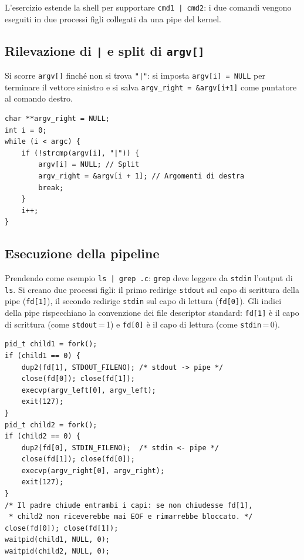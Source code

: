 \documentclass[a4paper,12pt]{article}
\begin{document}
L'esercizio estende la shell per supportare \texttt{cmd1 | cmd2}: i due
comandi vengono eseguiti in due processi figli collegati da una pipe del kernel.

\subsection*{Rilevazione di \texttt{|} e split di \texttt{argv[]}}

Si scorre \texttt{argv[]} finché non si trova \texttt{"|"}: si imposta
\texttt{argv[i] = NULL} per terminare il vettore sinistro e si salva
\texttt{argv\_right = \&argv[i+1]} come puntatore al comando destro.

\begin{lstlisting}[caption={Ricerca di | e pipeline}]
char **argv_right = NULL;
int i = 0;
while (i < argc) {
    if (!strcmp(argv[i], "|")) {
        argv[i] = NULL; // Split
        argv_right = &argv[i + 1]; // Argomenti di destra
        break;
    }
    i++;
}

\end{lstlisting}

\subsection*{Esecuzione della pipeline}

Prendendo come esempio \texttt{ls | grep .c}: \texttt{grep} deve leggere
da \texttt{stdin} l'output di \texttt{ls}. Si creano due processi figli:
il primo redirige \texttt{stdout} sul capo di scrittura della pipe
(\texttt{fd[1]}), il secondo redirige \texttt{stdin} sul capo di lettura
(\texttt{fd[0]}). Gli indici della pipe rispecchiano la convenzione dei
file descriptor standard: \texttt{fd[1]} è il capo di scrittura (come
\texttt{stdout}\,=\,1) e \texttt{fd[0]} è il capo di lettura (come
\texttt{stdin}\,=\,0).

\begin{lstlisting}[caption={Fork, redirect e attesa della pipeline}]
pid_t child1 = fork();
if (child1 == 0) {
    dup2(fd[1], STDOUT_FILENO); /* stdout -> pipe */
    close(fd[0]); close(fd[1]);
    execvp(argv_left[0], argv_left);
    exit(127);
}
pid_t child2 = fork();
if (child2 == 0) {
    dup2(fd[0], STDIN_FILENO);  /* stdin <- pipe */
    close(fd[1]); close(fd[0]);
    execvp(argv_right[0], argv_right);
    exit(127);
}
/* Il padre chiude entrambi i capi: se non chiudesse fd[1],
 * child2 non riceverebbe mai EOF e rimarrebbe bloccato. */
close(fd[0]); close(fd[1]);
waitpid(child1, NULL, 0);
waitpid(child2, NULL, 0);
\end{lstlisting}
\end{document}
